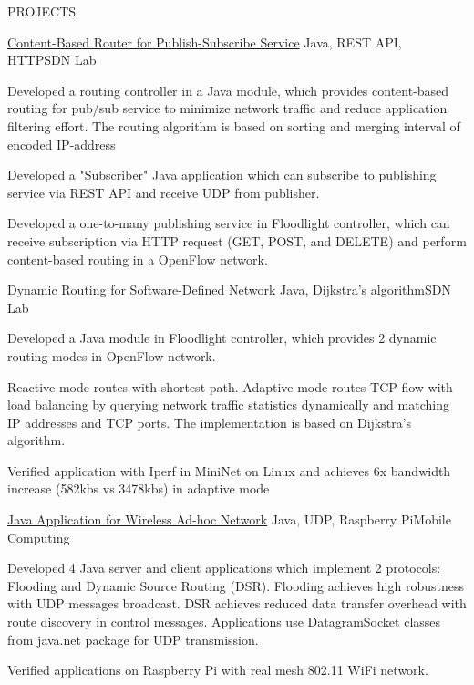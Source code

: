 \documentclass{resume} %
\begin{document}
\begin{rSection}{PROJECTS}
\begin{rSubsection}{\href{https://github.com/kuangyu0801/software-defined-networking-ws20/tree/main/sdn-assign-04}{Content-Based Router for Publish-Subscribe Service}} { Java, REST API, HTTP}{SDN Lab}{}
\item Developed a routing controller in a Java module, which provides content-based routing for pub/sub service to minimize network traffic and reduce application filtering effort. The routing algorithm is based on sorting and merging interval of encoded IP-address 
\item Developed a "Subscriber" Java application which can subscribe to publishing service via REST API and receive UDP  from publisher.
\item Developed a one-to-many publishing service in Floodlight controller, which can receive subscription via HTTP request (GET, POST, and DELETE) and perform content-based routing in a OpenFlow network.
\end{rSubsection}

\begin{rSubsection}{\href{https://github.com/kuangyu0801/software-defined-networking-ws20/tree/main/sdn-assign-03}{Dynamic Routing for Software-Defined Network}} {Java, Dijkstra's algorithm}{SDN Lab}{}
\item Developed a Java module in Floodlight controller, which provides 2 dynamic routing modes in OpenFlow network. 
\item Reactive mode routes with shortest path. Adaptive mode routes TCP flow with load balancing by querying network traffic statistics dynamically and matching IP addresses and TCP ports. The implementation is based on Dijkstra's algorithm.
\item Verified application with Iperf in MiniNet on Linux and achieves 6x bandwidth increase (582kbs vs 3478kbs) in adaptive mode
\end{rSubsection}

\begin{rSubsection}{\href{https://github.com/kuangyu0801/MobileComputing_SS20_assign04}{Java Application for Wireless Ad-hoc Network}} {Java, UDP, Raspberry Pi}{Mobile Computing}{}
\item Developed 4 Java server and client applications which implement 2 protocols: Flooding and Dynamic Source Routing (DSR). Flooding achieves high robustness with UDP messages broadcast. DSR achieves reduced data transfer overhead with route discovery in control messages. Applications use DatagramSocket classes from java.net package for UDP transmission.
\item Verified applications on Raspberry Pi with real mesh 802.11 WiFi network. 


\end{rSubsection}
\end{rSection}
\end{document}
